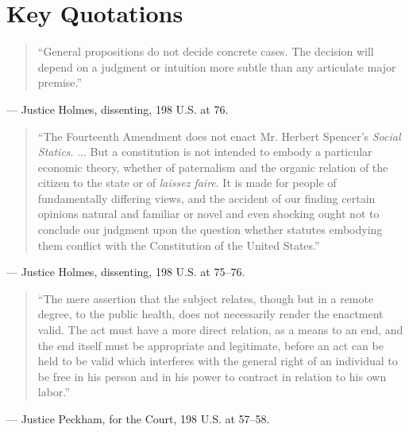 \documentclass[12pt]{article}
\begin{document}
\section{Key Quotations}

\begin{quote}
``General propositions do not decide concrete cases. The decision will depend on a judgment or intuition more subtle than any articulate major premise.''
\end{quote}
\noindent --- Justice Holmes, dissenting, 198 U.S. at 76.

\begin{quote}
``The Fourteenth Amendment does not enact Mr. Herbert Spencer's \textit{Social Statics}. ... But a constitution is not intended to embody a particular economic theory, whether of paternalism and the organic relation of the citizen to the state or of \textit{laissez faire}. It is made for people of fundamentally differing views, and the accident of our finding certain opinions natural and familiar or novel and even shocking ought not to conclude our judgment upon the question whether statutes embodying them conflict with the Constitution of the United States.''
\end{quote}
\noindent --- Justice Holmes, dissenting, 198 U.S. at 75--76.

\begin{quote}
``The mere assertion that the subject relates, though but in a remote degree, to the public health, does not necessarily render the enactment valid. The act must have a more direct relation, as a means to an end, and the end itself must be appropriate and legitimate, before an act can be held to be valid which interferes with the general right of an individual to be free in his person and in his power to contract in relation to his own labor.''
\end{quote}
\noindent --- Justice Peckham, for the Court, 198 U.S. at 57--58.
\end{document}
